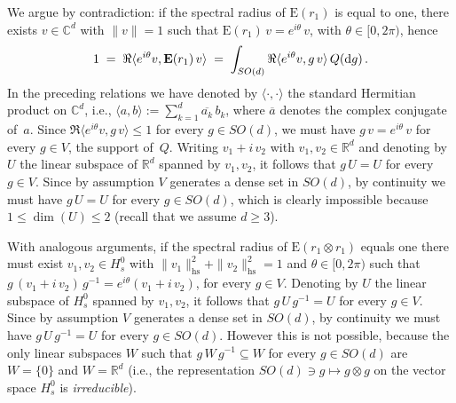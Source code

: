 \documentclass[a4paper,reqno,11pt]{amsart}
\numberwithin{equation}{section}
\newcommand{\dd}{\text{\rm d}}             %
\newcommand{\R}{\mathbb{R}}
\newcommand{\C}{\mathbb{C}}
\def\bE{\ensuremath{\bs{\mathrm{E}}}}
\def\bs{\boldsymbol}
\begin{document}
We argue by contradiction: if the spectral radius of $\bE(r_1)$
is equal to one, there exists $v \in \C^d$ with $\|v\| = 1$ such that
$\bE(r_1)\, v = e^{i \theta}\, v$, with $\theta \in [0,2\pi)$, hence
\begin{equation}
	1 \;=\; \Re \langle e^{i\theta} v , \bE(r_1)\, v \rangle \;=\;
	\int_{SO(d)} \Re \langle e^{i\theta} v , g\, v \rangle \, Q(\dd g) \,.
\end{equation}
In the preceding relations we have denoted by $\langle \cdot, \cdot \rangle$
the standard Hermitian product on $\C^d$, i.e.,
$\langle a, b \rangle := \sum_{k=1}^d \overline{a_k} \, b_k$,
where $\overline a$ denotes the complex conjugate of~$a$.
Since $\Re \langle e^{i\theta} v , g\, v \rangle \le 1$ for every $g \in SO(d)$,
we must have $g \, v = e^{i\theta}\, v$ for every $g \in V$, the support of~$Q$.
Writing $v_1 + i\, v_2$ with $v_1, v_2 \in \R^d$ and denoting by $U$ the
linear subspace of $\R^d$ spanned by $v_1, v_2$, it follows that
$g \, U = U$ for every $g \in V$. Since by assumption $V$ generates
a dense set in $SO(d)$, by continuity we must have
$g \, U = U$ for every $g \in SO(d)$, which is clearly impossible
because $1 \le \dim(U) \le 2$ (recall that we assume $d \ge 3$).

With analogous arguments, if the spectral radius of
$\bE(r_1 \otimes r_1)$ equals one there must exist
$v_1, v_2 \in H^0_s$ with $\| v_1 \|_{\text{hs}}^2 + \| v_2 \|_{\text{hs}}^2 = 1$
and $\theta \in [0,2\pi)$ such that
$g \, (v_1 + i\,v_2) \, g^{-1} = e^{i\theta} (v_1 + i\,v_2)$,
for every $g \in V$. Denoting by $U$ the
linear subspace of $H^0_s$ spanned by $v_1, v_2$, it follows that
$g \, U \, g^{-1} = U$ for every $g \in V$.
Since by assumption $V$ generates
a dense set in $SO(d)$, by continuity we must have
$g \, U \, g^{-1} = U$ for every $g \in SO(d)$.
However this is not possible, because
the only linear subspaces $W$ such that $g \, W \, g^{-1} \subseteq W$
for every $g \in SO(d)$ are $W=\{0\}$ and $W = \R^d$
(i.e., the representation $SO(d) \ni g \mapsto g \otimes g$
on the vector space $H^0_s$ is {\sl irreducible}).
\end{document}
